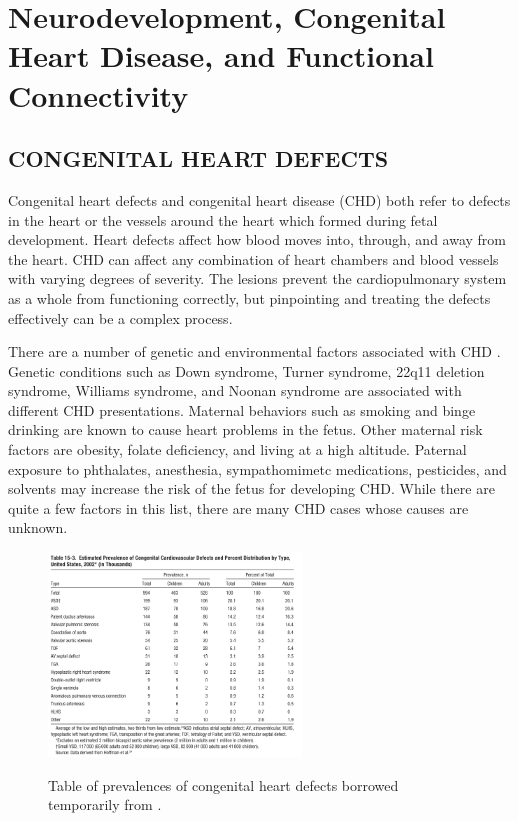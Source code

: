 \chapter{Neurodevelopment, Congenital Heart Disease, and Functional Connectivity}

\section{CONGENITAL HEART DEFECTS}

Congenital heart defects and congenital heart disease (CHD) both refer to defects in the heart or the vessels around the heart which formed during  fetal development. Heart defects affect how blood moves into, through, and away from the heart. 
CHD can affect any combination of heart chambers and blood vessels with varying degrees of severity. The lesions prevent the cardiopulmonary system as a whole from functioning correctly, but pinpointing and treating the defects effectively can be a complex process.
 
There are a number of genetic and environmental factors associated with CHD \cite{Mozaffarian2016}. Genetic conditions such as Down syndrome, Turner syndrome, 22q11 deletion syndrome, Williams syndrome, and Noonan syndrome are associated with different CHD presentations. Maternal behaviors such as smoking and binge drinking are known to cause heart problems in the fetus. Other maternal risk factors are obesity, folate deficiency, and living at a high altitude. Paternal exposure to phthalates, anesthesia, sympathomimetc medications, pesticides, and solvents may increase the risk of the fetus for developing CHD. While there are quite a few factors in this list, there are many CHD cases whose causes are unknown.

\begin{figure}
\centering
\includegraphics[width=0.6\textwidth]{2/chd-defects-usa.png}
\label{ch2:fig:usa-defects-prev}
\caption{Table of prevalences of congenital heart defects borrowed temporarily from \cite{Mozaffarian2016}.}
\end{figure}


